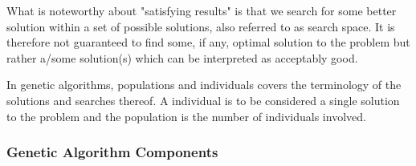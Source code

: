 What is noteworthy about "satisfying results" is that we search for some better solution within a set of possible solutions, also referred to as search space. It is therefore not guaranteed to find some, if any, optimal solution to the problem but rather a/some solution(s) which can be interpreted as acceptably good. \cite[pp. 20/21]{Sivanandam2008}


In genetic algorithms, populations and individuals covers the terminology of the solutions and searches thereof. A individual is to be considered a single solution to the problem and the population is the number of individuals involved. \cite[pp. 39]{Sivanandam2008} 



\subsubsection{Genetic Algorithm Components}

